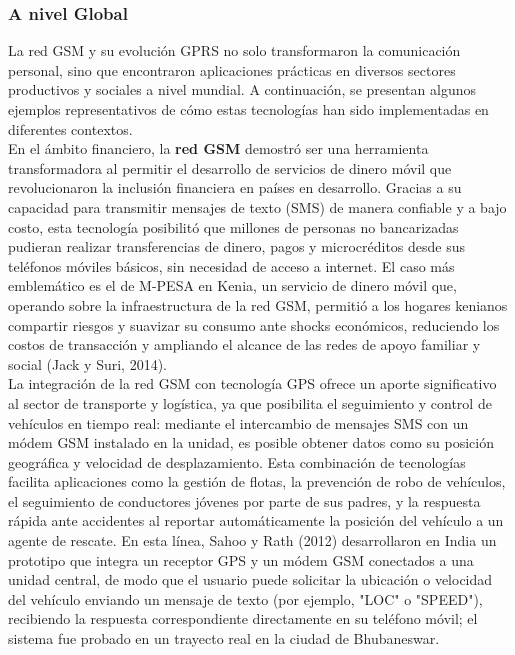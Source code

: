 \documentclass[12pt,a4paper]{article}
\begin{document}
	\subsubsection{A nivel Global}
	
	La red GSM y su evolución GPRS no solo transformaron la comunicación personal, sino que encontraron aplicaciones prácticas en diversos sectores productivos y sociales a nivel mundial.
	A continuación, se presentan algunos ejemplos representativos de cómo estas tecnologías han sido implementadas en diferentes contextos. \\
	
	En el ámbito financiero, la \textbf{red GSM} demostró ser una herramienta transformadora al permitir el desarrollo de servicios de dinero móvil que revolucionaron la inclusión financiera en países en desarrollo. Gracias a su capacidad para transmitir mensajes de texto (SMS) de manera confiable y a bajo costo, esta tecnología posibilitó que millones de personas no bancarizadas pudieran realizar transferencias de dinero, pagos y microcréditos desde sus teléfonos móviles básicos, sin necesidad de acceso a internet. El caso más emblemático es el de M-PESA en Kenia, un servicio de dinero móvil que, operando sobre la infraestructura de la red GSM, permitió a los hogares kenianos compartir riesgos y suavizar su consumo ante shocks económicos, reduciendo los costos de transacción y ampliando el alcance de las redes de apoyo familiar y social (Jack y Suri, 2014). \\
	
	La integración de la red GSM con tecnología GPS ofrece un aporte significativo al sector de transporte y logística, ya que posibilita el seguimiento y control de vehículos en tiempo real: mediante el intercambio de mensajes SMS con un módem GSM instalado en la unidad, es posible obtener datos como su posición geográfica y velocidad de desplazamiento. Esta combinación de tecnologías facilita aplicaciones como la gestión de flotas, la prevención de robo de vehículos, el seguimiento de conductores jóvenes por parte de sus padres, y la respuesta rápida ante accidentes al reportar automáticamente la posición del vehículo a un agente de rescate. En esta línea, Sahoo y Rath (2012) desarrollaron en India un prototipo que integra un receptor GPS y un módem GSM conectados a una unidad central, de modo que el usuario puede solicitar la ubicación o velocidad del vehículo enviando un mensaje de texto (por ejemplo, "LOC" o "SPEED"), recibiendo la respuesta correspondiente directamente en su teléfono móvil; el sistema fue probado en un trayecto real en la ciudad de Bhubaneswar. \\
	
\end{document}
